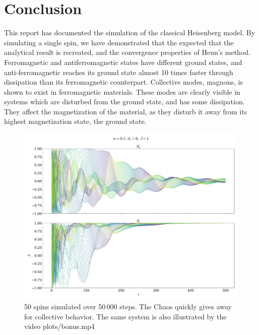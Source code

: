 \documentclass{article}
\begin{document}
    \section*{Conclusion}
    This report has documented the simulation of the classical Heisenberg model. By simulating a single spin, we have demonstrated that the expected that the analytical result is recreated, and the convergence properties of Heun's method.
    Ferromagnetic and antiferromagnetic states have different ground states, and anti-ferromagnetic reaches its ground state almost 10 times faster through dissipation than its ferromagnetic counterpart.
    Collective modes, magnons, is shown to exist in ferromagnetic materials.
    These modes are clearly visible in systems which are disturbed from the ground state, and has some dissipation.
    They affect the magnetization of the material, as they disturb it away from its highest magnetization state, the ground state.

    \printbibliography


    \begin{figure}[H]
        \hspace{- 5 cm}
        \includegraphics[width=1.5\textwidth]{../plots/bonus.pdf}
        \caption{50 spins simulated over 50\,000 steps. The Chaos quickly gives away for collective behavior. The same system is also illustrated by the video plots/bonus.mp4}
        \label{50 spins}
    \end{figure}
\end{document}
